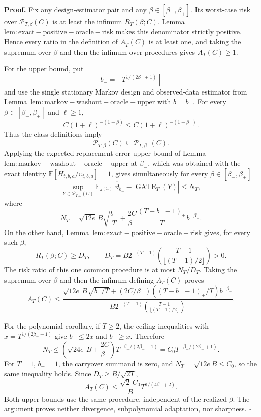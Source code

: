 \textbf{Proof.} Fix any design-estimator pair and any \(\beta\in[\beta_-,\beta_+]\). Its worst-case risk over \(\mathcal P_{T,\beta}(C)\) is at least the infimum \(R_T(\beta;C)\). Lemma~\(\mathrm{lem:exact-positive-oracle-risk}\) makes this denominator strictly positive. Hence every ratio in the definition of \(A_T(C)\) is at least one, and taking the supremum over \(\beta\) and then the infimum over procedures gives \(A_T(C)\ge1\).

For the upper bound, put
\[
b_-=\left\lceil T^{1/(2\beta_-+1)}\right\rceil
\]
and use the single stationary Markov design and observed-data estimator from Lemma~\(\mathrm{lem:markov-washout-oracle-upper}\) with \(b=b_-\). For every \(\beta\in[\beta_-,\beta_+]\) and \(\ell\ge1\),
\[
C(1+\ell)^{-(1+\beta)}
\le C(1+\ell)^{-(1+\beta_-)}.
\]
Thus the class definitions imply
\[
\mathcal P_{T,\beta}(C)\subseteq\mathcal P_{T,\beta_-}(C).
\]
Applying the expected replacement-error upper bound of Lemma~\(\mathrm{lem:markov-washout-oracle-upper}\) at \(\beta_-\), which was obtained with the exact identity \(\mathbb E[H_{t,b,a}/\upsilon_{t,b,a}]=1\), gives simultaneously for every \(\beta\in[\beta_-,\beta_+]\)
\[
\sup_{Y\in\mathcal P_{T,\beta}(C)}
\mathbb E_{\pi^{(b_-)}}
|\widehat\vartheta_{b_-}-\operatorname{GATE}_T(Y)|
\le N_T,
\]
where
\[
N_T=\sqrt{12e}\,B\sqrt{\frac{b_-}{T}}
+\frac{2C}{\beta_-}\frac{(T-b_--1)_+}{T}b_-^{-\beta_-}.
\]
On the other hand, Lemma~\(\mathrm{lem:exact-positive-oracle-risk}\) gives, for every such \(\beta\),
\[
R_T(\beta;C)\ge D_T,
\qquad
D_T=B2^{-(T-1)}\binom{T-1}{\lfloor(T-1)/2\rfloor}>0.
\]
The risk ratio of this one common procedure is at most \(N_T/D_T\). Taking the supremum over \(\beta\) and then the infimum defining \(A_T(C)\) proves
\[
A_T(C)\le
\frac{\sqrt{12e}\,B\sqrt{b_-/T}+(2C/\beta_-)((T-b_--1)_+/T)b_-^{-\beta_-}}
{B2^{-(T-1)}\binom{T-1}{\lfloor(T-1)/2\rfloor}}.
\]

For the polynomial corollary, if \(T\ge2\), the ceiling inequalities with \(x=T^{1/(2\beta_-+1)}\) give \(b_-\le2x\) and \(b_-\ge x\). Therefore
\[
N_T\le
\left(\sqrt{24e}\,B+\frac{2C}{\beta_-}\right)
T^{-\beta_-/(2\beta_-+1)}
=C_0T^{-\beta_-/(2\beta_-+1)}.
\]
For \(T=1\), \(b_-=1\), the carryover summand is zero, and \(N_T=\sqrt{12e}B\le C_0\), so the same inequality holds. Since \(D_T\ge B/\sqrt{2T}\),
\[
A_T(C)
\le\frac{\sqrt2\,C_0}{B}T^{1/(4\beta_-+2)}.
\]
Both upper bounds use the same procedure, independent of the realized \(\beta\). The argument proves neither divergence, subpolynomial adaptation, nor sharpness. \(\square\)
